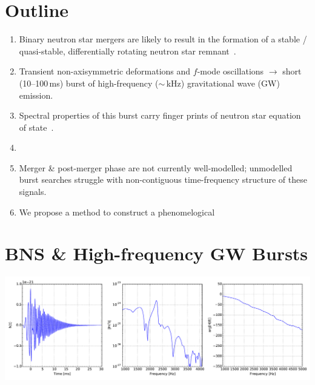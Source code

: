 \documentclass[a0,landscape]{a0poster}
\def\gw#1{gravitational wave#1 (GW#1)\gdef\gw{GW}}
\begin{document}
\begin{multicols}{4}



\color{DarkSlateGray} %

\section*{\centering Outline}

\begin{enumerate}
\item Binary neutron star mergers are likely to result in the formation of a
    stable / quasi-stable, differentially rotating neutron star remnant~\cite{}.
\item Transient non-axisymmetric deformations and $f$-mode oscillations
    $\rightarrow$ short (10--100\,ms) burst of high-frequency ($\sim $\,kHz)
    \gw{} emission.
\item Spectral properties of this burst carry finger prints of neutron star
    equation of state~\cite{Bauswein38Eos}.
\item 
\item Merger \& post-merger phase are not currently well-modelled; unmodelled
    burst searches struggle with non-contiguous time-frequency structure of
    these signals.
\item We propose a method to construct a phenomelogical
\end{enumerate}


\section*{\centering BNS \& High-frequency GW Bursts}

\begin{center}%
    \includegraphics[width=\linewidth]{example_waveform.pdf}%
\end{center}%



\end{multicols}
\end{document}
